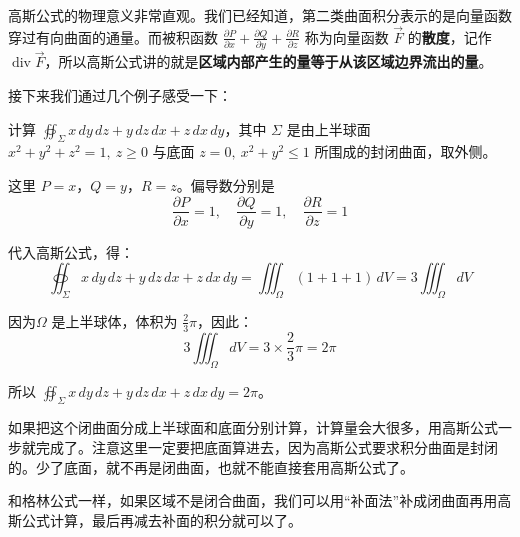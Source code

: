 高斯公式的物理意义非常直观。我们已经知道，第二类曲面积分表示的是向量函数穿过有向曲面的通量。而被积函数 \(\frac{\partial P}{\partial x}+\frac{\partial Q}{\partial y}+\frac{\partial R}{\partial z}\) 称为向量函数 \(\vec{F}\) 的\textbf{散度}，记作 \(\operatorname{div}\vec{F}\)，所以高斯公式讲的就是\textbf{区域内部产生的量等于从该区域边界流出的量}。

接下来我们通过几个例子感受一下：

\begin{myexample}
计算 \(\oiint_{\Sigma} x\,dy\,dz + y\,dz\,dx + z\,dx\,dy\)，其中 \(\Sigma\) 是由上半球面 \(x^2+y^2+z^2=1,\ z\ge 0\) 与底面 \(z=0,\ x^2+y^2\le 1\) 所围成的封闭曲面，取外侧。

这里 \(P=x\)，\(Q=y\)，\(R=z\)。偏导数分别是
\[
\frac{\partial P}{\partial x}=1,\quad \frac{\partial Q}{\partial y}=1,\quad \frac{\partial R}{\partial z}=1
\]

代入高斯公式，得：
\[
\oiint_{\Sigma} x\,dy\,dz + y\,dz\,dx + z\,dx\,dy = \iiint_{\Omega} (1+1+1)\,dV = 3 \iiint_{\Omega} dV
\]

因为\(\Omega\) 是上半球体，体积为 \(\frac{2}{3}\pi\)，因此：
\[
3 \iiint_{\Omega} dV = 3 \times \frac{2}{3}\pi = 2\pi
\]

所以 \(\oiint_{\Sigma} x\,dy\,dz + y\,dz\,dx + z\,dx\,dy = 2\pi\)。
\end{myexample}

如果把这个闭曲面分成上半球面和底面分别计算，计算量会大很多，用高斯公式一步就完成了。注意这里一定要把底面算进去，因为高斯公式要求积分曲面是封闭的。少了底面，就不再是闭曲面，也就不能直接套用高斯公式了。

和格林公式一样，如果区域不是闭合曲面，我们可以用“补面法”补成闭曲面再用高斯公式计算，最后再减去补面的积分就可以了。

